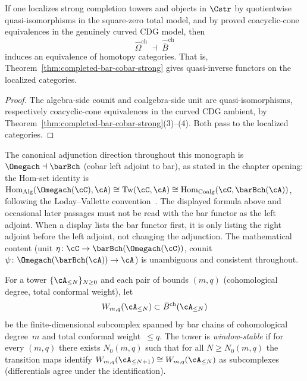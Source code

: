 \begin{corollary}
\label{cor:completion-closure-equivalence}
If one localizes strong completion towers and objects in $\Cstr$ by
quotientwise quasi-isomorphisms in the square-zero total model, and
by proved coacyclic-cone equivalences in the genuinely curved CDG
model, then
\[
\widehat\Omega^{\mathrm{ch}} \;\dashv\; \widehat{\bar B}^{\mathrm{ch}}
\]
induces an equivalence of homotopy categories. That is,
Theorem~\textup{\ref{thm:completed-bar-cobar-strong}} gives quasi-inverse
functors on the localized categories.
\end{corollary}

\begin{proof}
The algebra-side counit and coalgebra-side unit are quasi-isomorphisms,
respectively coacyclic-cone equivalences in the curved CDG ambient, by
Theorem~\ref{thm:completed-bar-cobar-strong}(3)--(4). Both pass to
the localized categories.
\end{proof}

\begin{remark}\label{rem:adjunction-direction-convention}
The canonical adjunction direction throughout this monograph is
$\Omegach \dashv \barBch$ (cobar left adjoint to bar), as stated in
the chapter opening: the Hom-set identity is
$\operatorname{Hom}_{\mathrm{Alg}}(\Omegach(\cC), \cA)
\cong \operatorname{Tw}(\cC, \cA)
\cong \operatorname{Hom}_{\mathrm{Coalg}}(\cC, \barBch(\cA))$,
following the Loday--Vallette convention~\textup{\cite{LV12}}.
The displayed formula above and occasional later passages must not be
read with the bar functor as the left adjoint. When a display lists
the bar functor first, it is only listing the right adjoint before the
left adjoint, not changing the adjunction.
The mathematical content (unit
$\eta \colon \cC \to \barBch(\Omegach(\cC))$, counit
$\psi \colon \Omegach(\barBch(\cA)) \to \cA$) is
unambiguous and consistent throughout.
\end{remark}

\begin{definition}
\label{def:window-stability}
For a tower $\{\cA_{\le N}\}_{N \ge 0}$ and each pair of bounds
$(m,q)$ (cohomological degree, total conformal weight), let
\[
W_{m,q}(\cA_{\le N})
\subset \bar B^{\mathrm{ch}}(\cA_{\le N})
\]
be the finite-dimensional subcomplex spanned by bar chains of
cohomological degree~$m$ and total conformal weight~$\le q$. The tower
is \emph{window-stable} if for every $(m,q)$ there exists $N_0(m,q)$
such that for all $N \ge N_0(m,q)$ the transition maps identify
$W_{m,q}(\cA_{\le N+1}) \cong W_{m,q}(\cA_{\le N})$ as subcomplexes
(differentials agree under the identification).
\end{definition}

